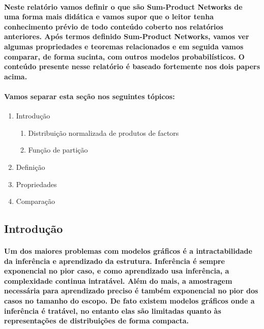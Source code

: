 \documentclass[a4paper,10pt]{article}
\theoremstyle{plain}
\begin{document}
\paragraph{
  Neste relatório vamos definir o que são Sum-Product Networks de uma forma mais didática e vamos
  supor que o leitor tenha conhecimento prévio de todo conteúdo coberto nos relatórios anteriores.
  Após termos definido Sum-Product Networks, vamos ver algumas propriedades e teoremas relacionados
  e em seguida vamos comparar, de forma sucinta, com outros modelos probabilísticos. O conteúdo
  presente nesse relatório é baseado fortemente nos dois papers acima.
}

\paragraph{
  Vamos separar esta seção nos seguintes tópicos:
}

\begin{enumerate}
  \item Introdução
    \begin{enumerate}[label*=\arabic*.]
      \item Distribuição normalizada de produtos de factors
      \item Função de partição
    \end{enumerate}
  \item Definição
  \item Propriedades
  \item Comparação
\end{enumerate}

\subsection{Introdução}

\paragraph{
  Um dos maiores problemas com modelos gráficos é a intractabilidade da inferência e aprendizado
  da estrutura. Inferência é sempre exponencial no pior caso, e como aprendizado usa inferência,
  a complexidade continua intratável. Além do mais, a amostragem necessária para aprendizado
  preciso é também exponencial no pior dos casos no tamanho do escopo. De fato existem modelos
  gráficos onde a inferência é tratável, no entanto elas são limitadas quanto às representações
  de distribuições de forma compacta.
}
\end{document}
